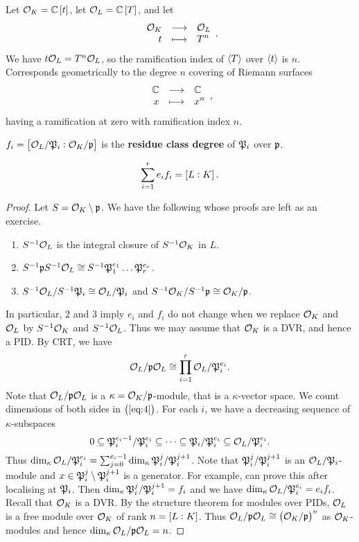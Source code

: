 \begin{example*}
Let $ \OOO_K = \CC\sbr{t} $, let $ \OOO_L = \CC\sbr{T} $, and let
$$ \function{\OOO_K}{\OOO_L}{t}{T^n}. $$
We have $ t\mathcal{O}_L = T^n\mathcal{O}_L $, so the ramification index of $ \left\langle T \right\rangle $ over $ \left\langle t \right\rangle $ is $ n $. Corresponds geometrically to the degree $ n $ covering of Riemann surfaces
$$ \function{\CC}{\CC}{x}{x^n}, $$
having a ramification at zero with ramification index $ n $.
\end{example*}

\begin{definition}
$ f_i = \sbr{\OOO_L / \pp_i : \OOO_K / \ppp} $ is the \textbf{residue class degree} of $ \mathfrak{P}_i $ over $ \mathfrak{p} $.
\end{definition}

\begin{theorem}
\label{thm:13.3}
$$ \sum_{i = 1}^r e_if_i = \sbr{L : K}. $$
\end{theorem}

\begin{proof}
Let $ S = \mathcal{O}_K \setminus \mathfrak{p} $. We have the following whose proofs are left as an exercise.
\begin{enumerate}
\item $ S^{-1}\mathcal{O}_L $ is the integral closure of $ S^{-1}\mathcal{O}_K $ in $ L $.
\item $ S^{-1}\mathfrak{p} S^{-1}\mathcal{O}_L \cong S^{-1}\mathfrak{P}_1^{e_1} \dots \mathfrak{P}_r^{e_r} $.
\item $ S^{-1}\mathcal{O}_L / S^{-1}\mathfrak{P}_i \cong \mathcal{O}_L / \mathfrak{P}_i $ and $ S^{-1}\mathcal{O}_K / S^{-1}\mathfrak{p} \cong \mathcal{O}_K / \mathfrak{p} $.
\end{enumerate}
In particular, $ 2 $ and $ 3 $ imply $ e_i $ and $ f_i $ do not change when we replace $ \mathcal{O}_K $ and $ \mathcal{O}_L $ by $ S^{-1}\mathcal{O}_K $ and $ S^{-1}\mathcal{O}_L $. Thus we may assume that $ \mathcal{O}_K $ is a DVR, and hence a PID. By CRT, we have
\begin{equation}
\label{eq:4}
\mathcal{O}_L / \mathfrak{p}\mathcal{O}_L \cong \prod_{i = 1}^r \mathcal{O}_L / \mathfrak{P}_i^{e_i}.
\end{equation}
Note that $ \mathcal{O}_L / \mathfrak{p}\mathcal{O}_L $ is a $ \kappa = \mathcal{O}_K / \mathfrak{p} $-module, that is a $ \kappa $-vector space. We count dimensions of both sides in $ \br{\ref{eq:4}} $. For each $ i $, we have a decreasing sequence of $ \kappa $-subspaces
$$ 0 \subseteq \mathfrak{P}_i^{e_i - 1} / \mathfrak{P}_i^{e_i} \subseteq \dots \subseteq \mathfrak{P}_i / \mathfrak{P}_i^{e_i} \subseteq \mathcal{O}_L / \mathfrak{P}_i^{e_i}. $$
Thus $ \dim_\kappa \mathcal{O}_L / \mathfrak{P}_i^{e_i} = \sum_{j = 0}^{e_i - 1} \dim_\kappa \mathfrak{P}_i^j / \mathfrak{P}_i^{j + 1} $. Note that $ \mathfrak{P}_i^j / \mathfrak{P}_i^{j + 1} $ is an $ \mathcal{O}_L / \mathfrak{P}_i $-module and $ x \in \mathfrak{P}_i^j \setminus \mathfrak{P}_i^{j + 1} $ is a generator. For example, can prove this after localising at $ \mathfrak{P}_i $. Then $ \dim_\kappa \mathfrak{P}_i^j / \mathfrak{P}_i^{j + 1} = f_i $ and we have $ \dim_\kappa \mathcal{O}_L / \mathfrak{P}_i^{e_i} = e_if_i $. Recall that $ \mathcal{O}_K $ is a DVR. By the structure theorem for modules over PIDs, $ \mathcal{O}_L $ is a free module over $ \mathcal{O}_K $ of rank $ n = \sbr{L : K} $. Thus $ \OOO_L / \ppp\OOO_L \cong \br{\OOO_K / \ppp}^n $ as $ \mathcal{O}_K $-modules and hence $ \dim_\kappa \mathcal{O}_L / \mathfrak{p}\mathcal{O}_L = n $.
\end{proof}

